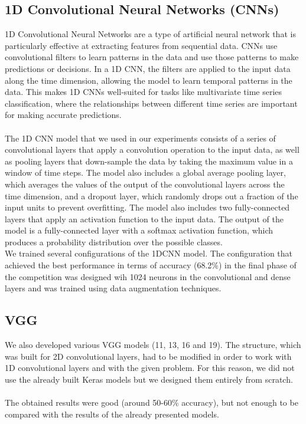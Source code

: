\documentclass[11pt, oneside]{article}
\begin{document}
\subsection{1D Convolutional Neural Networks (CNNs)}
1D Convolutional Neural Networks are a type of artificial neural network that is particularly effective at extracting features from sequential data. CNNs use convolutional filters to learn patterns in the data and use those patterns to make predictions or decisions. In a 1D CNN, the filters are applied to the input data along the time dimension, allowing the model to learn temporal patterns in the data. This makes 1D CNNs well-suited for tasks like multivariate time series classification, where the relationships between different time series are important for making accurate predictions.\\\\
The 1D CNN model that we used in our experiments consists of a series of convolutional layers that apply a convolution operation to the input data, as well as pooling layers that down-sample the data by taking the maximum value in a window of time steps. The model also includes a global average pooling layer, which averages the values of the output of the convolutional layers across the time dimension, and a dropout layer, which randomly drops out a fraction of the input units to prevent overfitting. The model also includes two fully-connected layers that apply an activation function to the input data. The output of the model is a fully-connected layer with a softmax activation function, which produces a probability distribution over the possible classes.
\\
We trained several configurations of the 1DCNN model. The configuration that achieved the best performance in terms of accuracy (68.2\%) in the final phase of the competition was designed wih 1024 neurons in the convolutional and dense layers and was trained using data augmentation techniques.

\subsection{VGG}
We also developed various VGG models (11, 13, 16 and 19). The structure, which was built for 2D convolutional layers, had to be modified in order to work with 1D convolutional layers and with the given problem.
For this reason, we did not use the already built Keras models but we designed them entirely from scratch.\\\\
The obtained results were good (around 50-60\% accuracy), but not enough to be compared with the results of the already presented models.
\end{document}
